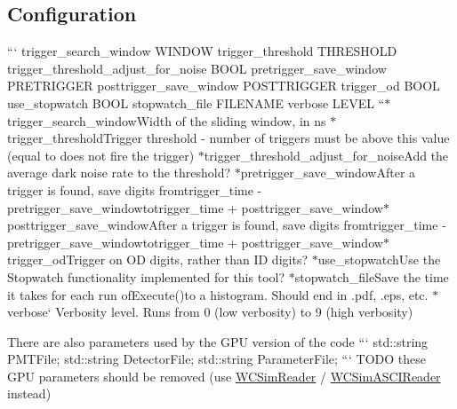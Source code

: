 \subsection*{Configuration}

``` trigger\-\_\-search\-\_\-window W\-I\-N\-D\-O\-W trigger\-\_\-threshold T\-H\-R\-E\-S\-H\-O\-L\-D trigger\-\_\-threshold\-\_\-adjust\-\_\-for\-\_\-noise B\-O\-O\-L pretrigger\-\_\-save\-\_\-window P\-R\-E\-T\-R\-I\-G\-G\-E\-R posttrigger\-\_\-save\-\_\-window P\-O\-S\-T\-T\-R\-I\-G\-G\-E\-R trigger\-\_\-od B\-O\-O\-L use\-\_\-stopwatch B\-O\-O\-L stopwatch\-\_\-file F\-I\-L\-E\-N\-A\-M\-E verbose L\-E\-V\-E\-L ``{\ttfamily  $\ast$}trigger\-\_\-search\-\_\-window{\ttfamily Width of the sliding window, in ns $\ast$}trigger\-\_\-threshold{\ttfamily Trigger threshold -\/ number of triggers must be above this value (equal to does not fire the trigger) $\ast$}trigger\-\_\-threshold\-\_\-adjust\-\_\-for\-\_\-noise{\ttfamily Add the average dark noise rate to the threshold? $\ast$}pretrigger\-\_\-save\-\_\-window{\ttfamily After a trigger is found, save digits from}trigger\-\_\-time -\/ pretrigger\-\_\-save\-\_\-window{\ttfamily to}trigger\-\_\-time + posttrigger\-\_\-save\-\_\-window{\ttfamily  $\ast$}posttrigger\-\_\-save\-\_\-window{\ttfamily After a trigger is found, save digits from}trigger\-\_\-time -\/ pretrigger\-\_\-save\-\_\-window{\ttfamily to}trigger\-\_\-time + posttrigger\-\_\-save\-\_\-window{\ttfamily  $\ast$}trigger\-\_\-od{\ttfamily Trigger on O\-D digits, rather than I\-D digits? $\ast$}use\-\_\-stopwatch{\ttfamily Use the Stopwatch functionality implemented for this tool? $\ast$}stopwatch\-\_\-file{\ttfamily Save the time it takes for each run of}Execute(){\ttfamily to a histogram. Should end in .pdf, .eps, etc. $\ast$}verbose` Verbosity level. Runs from 0 (low verbosity) to 9 (high verbosity)

There are also parameters used by the G\-P\-U version of the code ``` std\-::string P\-M\-T\-File; std\-::string Detector\-File; std\-::string Parameter\-File; ``` T\-O\-D\-O these G\-P\-U parameters should be removed (use \hyperlink{classWCSimReader}{W\-C\-Sim\-Reader} / \hyperlink{classWCSimASCIReader}{W\-C\-Sim\-A\-S\-C\-I\-Reader} instead) 